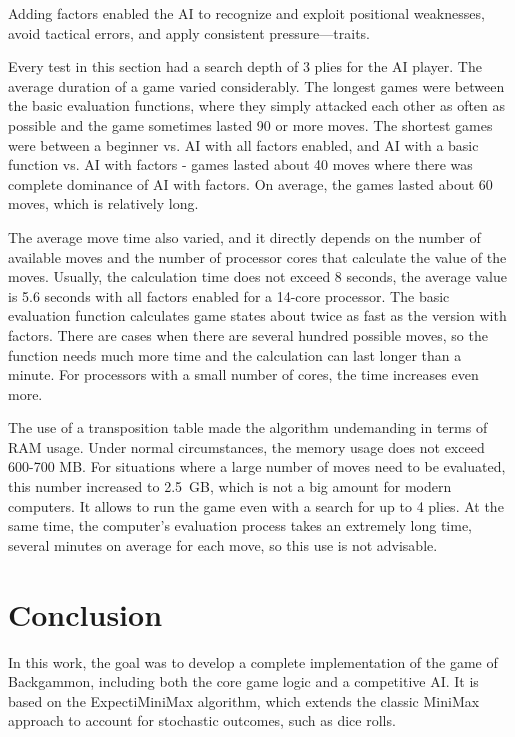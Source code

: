  Adding factors enabled the AI to recognize and exploit positional weaknesses, avoid tactical errors, and apply consistent pressure—traits.

 Every test in this section had a search depth of 3 plies for the AI player. The average duration of a game varied considerably. The longest games were between the basic evaluation functions, where they simply attacked each other as often as possible and the game sometimes lasted 90 or more moves. The shortest games were between a beginner vs. AI with all factors enabled, and AI with a basic function vs. AI with factors - games lasted about 40 moves where there was complete dominance of AI with factors. On average, the games lasted about 60 moves, which is relatively long.

 The average move time also varied, and it directly depends on the number of available moves and the number of processor cores that calculate the value of the moves. Usually, the calculation time does not exceed 8 seconds, the average value is 5.6 seconds with all factors enabled for a 14-core processor. The basic evaluation function calculates game states about twice as fast as the version with factors. There are cases when there are several hundred possible moves, so the function needs much more time and the calculation can last longer than a minute.  For processors with a small number of cores, the time increases even more.

The use of a transposition table made the algorithm undemanding in terms of RAM usage. Under normal circumstances, the memory usage does not exceed 600-700 MB. For situations where a large number of moves need to be evaluated, this number increased to 2.5~GB, which is not a big amount for modern computers. It allows to run the game even with a search for up to 4 plies. At the same time, the computer's evaluation process takes an extremely long time, several minutes on average for each move, so this use is not advisable.





\chapter{Conclusion}\label{conclusion}
\vspace{-2\baselineskip}
In this work, the goal was to develop a complete implementation of the game of Backgammon, including both the core game logic and a competitive AI. It is based on the ExpectiMiniMax algorithm, which extends the classic MiniMax approach to account for stochastic outcomes, such as dice rolls.

